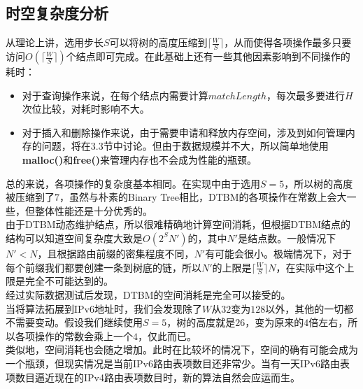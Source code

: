 \begin{algorithm}
\NoCaptionOfAlgo
\caption{$Delete(P)$}
\end{algorithm}
	
\subsection{时空复杂度分析}

从理论上讲，选用步长$S$可以将树的高度压缩到$\lceil\frac{W}{S}\rceil$，从而使得各项操作最多只要访问$O(\lceil\frac{W}{S}\rceil)$个结点即可完成。在此基础上还有一些其他因素影响到不同操作的耗时：
\begin{itemize}
\item 对于查询操作来说，在每个结点内需要计算$matchLength$，每次最多要进行$H$次位比较，对耗时影响不大。
\item 对于插入和删除操作来说，由于需要申请和释放内存空间，涉及到如何管理内存的问题，将在3.3节中讨论。但由于数据规模并不大，所以简单地使用\textbf{malloc()}和\textbf{free()}来管理内存也不会成为性能的瓶颈。
\end{itemize}
总的来说，各项操作的复杂度基本相同。在实现中由于选用$S = 5$，所以树的高度被压缩到了$7$，虽然与朴素的Binary Tree相比，DTBM的各项操作在常数上会大一些，但整体性能还是十分优秀的。\\
\indent
由于DTBM动态维护结点，所以很难精确地计算空间消耗，但根据DTBM结点的结构可以知道空间复杂度大致是$O(2^{S}N')$的，其中$N'$是结点数。一般情况下$N' < N$，且根据路由前缀的密集程度不同，$N'$有可能会很小。极端情况下，对于每个前缀我们都要创建一条到树底的链，所以$N'$的上限是$\lceil\frac{W}{S}\rceil N$，在实际中这个上限是完全不可能达到的。\\
\indent
经过实际数据测试后发现，DTBM的空间消耗是完全可以接受的。\\
\indent
当将算法拓展到IPv6地址时，我们会发现除了$W$从$32$变为$128$以外，其他的一切都不需要变动。假设我们继续使用$S = 5$，树的高度就是$26$，变为原来的$4$倍左右，所以各项操作的常数会乘上一个$4$，仅此而已。\\
\indent
类似地，空间消耗也会随之增加。此时在比较坏的情况下，空间的确有可能会成为一个瓶颈，但现实情况是当前IPv6路由表项数目还非常少。当有一天IPv6路由表项数目逼近现在的IPv4路由表项数目时，新的算法自然会应运而生。\\

\clearpage
